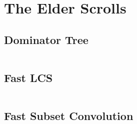 \section{The Elder Scrolls}

\subsection{Dominator Tree}

\inputminted{cpp}{\code/dominator_tree.cpp}

\subsection{Fast LCS}

\inputminted{cpp}{\code/fast_lcs.cpp}

\subsection{Fast Subset Convolution}

\inputminted{cpp}{\code/fast_subset_convolution.cpp}
